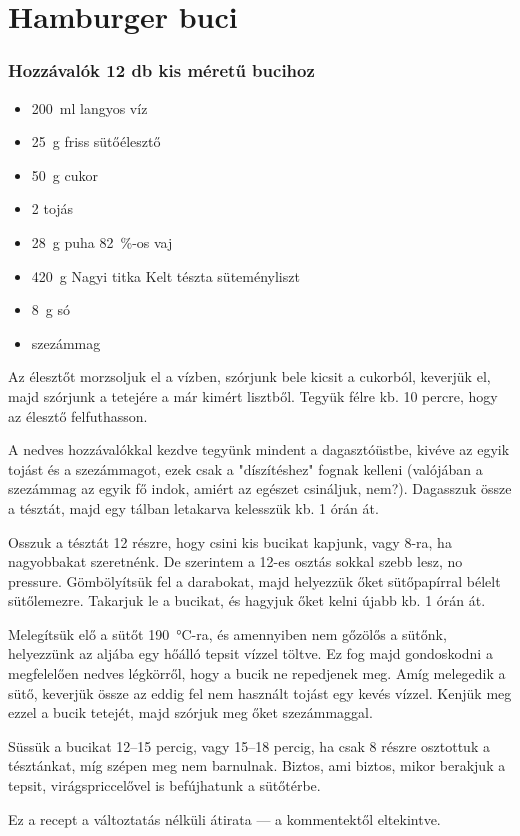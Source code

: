 \newpage
\section*{Hamburger buci}

\subsubsection*{Hozzávalók 12 db kis méretű bucihoz}
\begin{itemize}
    \item \qty{200}{\ml} langyos víz
    \item \qty{25}{\g} friss sütőélesztő
    \item \qty{50}{\g} cukor
    \item \num{2} tojás
    \item \qty{28}{\g} puha \qty{82}{\percent}-os vaj
    \item \qty{420}{\g} Nagyi titka Kelt tészta süteményliszt
    \item \qty{8}{\g} só
    \item szezámmag
\end{itemize}

Az élesztőt morzsoljuk el a vízben, szórjunk bele kicsit a cukorból, keverjük el, majd szórjunk a tetejére a már kimért lisztből. Tegyük félre kb. \num{10} percre, hogy az élesztő felfuthasson.

A nedves hozzávalókkal kezdve tegyünk mindent a dagasztóüstbe, kivéve az egyik tojást és a szezámmagot, ezek csak a "díszítéshez" fognak kelleni (valójában a szezámmag az egyik fő indok, amiért az egészet csináljuk, nem?). Dagasszuk össze a tésztát, majd egy tálban letakarva kelesszük kb. \num{1} órán át.

Osszuk a tésztát \num{12} részre, hogy csini kis bucikat kapjunk, vagy \num{8}-ra, ha nagyobbakat szeretnénk. De szerintem a \num{12}-es osztás sokkal szebb lesz, no pressure. Gömbölyítsük fel a darabokat, majd helyezzük őket sütőpapírral bélelt sütőlemezre. Takarjuk le a bucikat, és hagyjuk őket kelni újabb kb. \num{1} órán át.

Melegítsük elő a sütőt \qty{190}{\celsius}-ra, és amennyiben nem gőzölős a sütőnk, helyezzünk az aljába egy hőálló tepsit vízzel töltve. Ez fog majd gondoskodni a megfelelően nedves légkörről, hogy a bucik ne repedjenek meg. Amíg melegedik a sütő, keverjük össze az eddig fel nem használt tojást egy kevés vízzel. Kenjük meg ezzel a bucik tetejét, majd szórjuk meg őket szezámmaggal.

Süssük a bucikat \numrange{12}{15} percig, vagy \numrange{15}{18} percig, ha csak \num{8} részre osztottuk a tésztánkat, míg szépen meg nem barnulnak. Biztos, ami biztos, mikor berakjuk a tepsit, virágspriccelővel is befújhatunk a sütőtérbe.

Ez a recept a \cite{kab_hamburger} változtatás nélküli átirata --- a kommentektől eltekintve.
